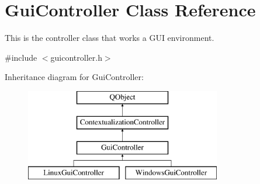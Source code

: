 \hypertarget{classGuiController}{}\section{Gui\+Controller Class Reference}
\label{classGuiController}


This is the controller class that works a G\+UI environment.  




{\ttfamily \#include $<$guicontroller.\+h$>$}

Inheritance diagram for Gui\+Controller\+:\begin{figure}[H]
\begin{center}
\leavevmode
\includegraphics[height=4.000000cm]{classGuiController}
\end{center}
\end{figure}
